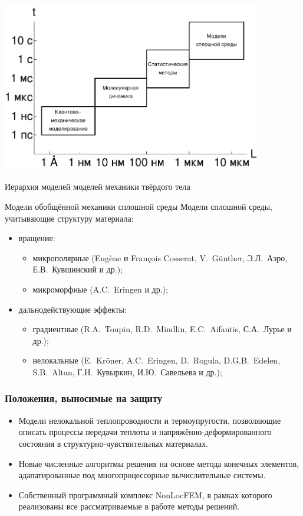 \begin{frame}
	\begin{center}
	\includegraphics[width=0.85\textwidth]{pics/ModelsHierarchy.pdf}
	
	Иерархия моделей моделей механики твёрдого тела
	\end{center}
\end{frame}

\begin{frame}{Модели обобщённой механики сплошной среды}
	Модели сплошной среды, учитывающие структуру материала:
	\begin{itemize}
		\item вращение:
		\begin{itemize}
			\justifying
			\item микрополярные (Eugène и François Cosserat, V.~G{\"u}nther, Э.Л.~Аэро, Е.В.~Кувшинский и др.);
			\item микроморфные (A.C.~Eringen и др.);
		\end{itemize}
		\item дальнодействующие эффекты:
		\begin{itemize}
			\justifying
			\item градиентные (R.A.~Toupin, R.D.~Mindlin, E.C.~Aifantis, С.А.~Лурье и др.);
			\item нелокальные (E.~Kr{\"o}ner, A.C.~Eringen, D.~Rogula, D.G.B.~Edelen, S.B.~Altan, Г.Н.~Кувыркин, И.Ю.~Савельева и др.);
		\end{itemize}
	\end{itemize}
\end{frame}

\begin{frame}
    \frametitle{Положения, выносимые на защиту}
    \begin{itemize}
    	\justifying
        \item Модели нелокальной теплопроводности и термоупругости, позволяющие описать процессы передачи теплоты и напряжённо-деформированного состояния в структурно-чувствительных материалах.
        \item Новые численные алгоритмы решения на основе метода конечных элементов, адапатированные под многопроцессорные вычислительные системы.
        \item Собственный программный комплекс NonLocFEM, в рамках которого реализованы все рассматриваемые в работе методы решений.
    \end{itemize}
\end{frame}
